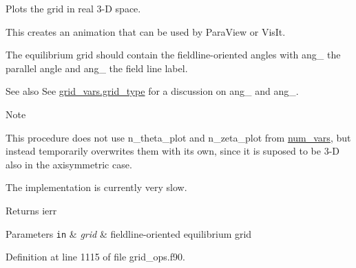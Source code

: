 Plots the grid in real 3-\/D space. 

This creates an animation that can be used by Para\+View or Vis\+It.

The equilibrium grid should contain the fieldline-\/oriented angles with {\ttfamily ang\+\_} the parallel angle and {\ttfamily ang\+\_} the field line label.

\begin{DoxySeeAlso}{See also}
See \hyperlink{structgrid__vars_1_1grid__type}{grid\+\_\+vars.\+grid\+\_\+type} for a discussion on {\ttfamily ang\+\_} and {\ttfamily ang\+\_}.
\end{DoxySeeAlso}
\begin{DoxyNote}{Note}

\begin{DoxyEnumerate}
\item This procedure does not use {\ttfamily n\+\_\+theta\+\_\+plot} and {\ttfamily n\+\_\+zeta\+\_\+plot} from \hyperlink{namespacenum__vars}{num\+\_\+vars}, but instead temporarily overwrites them with its own, since it is suposed to be 3-\/D also in the axisymmetric case.
\item The implementation is currently very slow.
\end{DoxyEnumerate}
\end{DoxyNote}
\begin{DoxyReturn}{Returns}
ierr
\end{DoxyReturn}

\begin{DoxyParams}[1]{Parameters}
\mbox{\tt in}  & {\em grid} & fieldline-\/oriented equilibrium grid \\
\hline
\end{DoxyParams}


Definition at line 1115 of file grid\+\_\+ops.\+f90.

